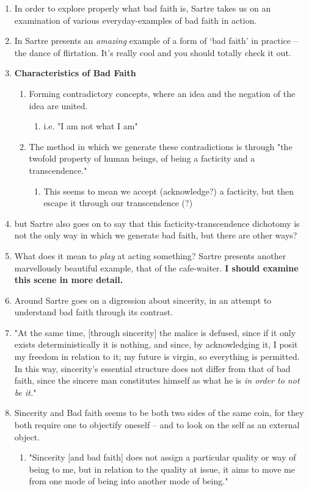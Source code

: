 \begin{enumerate}
  \item In order to explore properly what bad faith is, Sartre takes us on an examination of various everyday-examples of bad faith in action.
  \item In \autocite[98]{sartre} Sartre presents an \emph{amazing} example of a form of `bad faith' in practice -- the dance of flirtation. It's really cool and you should totally check it out.
  \item \textbf{Characteristics of Bad Faith}
  \begin{enumerate}
    \item Forming contradictory concepts, where an idea and the negation of the idea are united.
    \begin{enumerate}
      \item i.e. "I am not what I am"
    \end{enumerate}
    \item The method in which we generate these contradictions is through "the twofold property of human beings, of being a facticity and a transcendence." \autocite[99]{sartre}
    \begin{enumerate}
      \item This seems to mean we accept (acknowledge?) a facticity, but then escape it through our transcendence (?)
    \end{enumerate}
  \end{enumerate}
  \item but Sartre also goes on to say that this facticity-transcendence dichotomy is not the only way in which we generate bad faith, but there are other ways?
  \item \autocite[102]{sartre} What does it mean to \emph{play} at acting something? Sartre presents another marvellously beautiful example, that of the cafe-waiter. \textbf{I should examine this scene in more detail.}
  \item Around \autocite[109]{sartre} Sartre goes on a digression about sincerity, in an attempt to understand bad faith through its contrast.
  \item "At the same time, [through sincerity] the malice is defused, since if it only exists deterministically it is nothing, and since, by acknowledging it, I posit my freedom in relation to it; my future is virgin, so everything is permitted. In this way, sincerity's essential structure does not differ from that of bad faith, since the sincere man constitutes himself as what he is \emph{in order to not be it.}" \autocite[110]{sartre}
  \item Sincerity and Bad faith seems to be both two sides of the same coin, for they both require one to objectify oneself -- and to look on the self as an external object.
  \begin{enumerate}
    \item "Sincerity [and bad faith] does not assign a particular quality or way of being to me, but in relation to the quality at issue, it aims to move me from one mode of being into another mode of being." \autocite[111]{sartre}
  \end{enumerate}
\end{enumerate}


